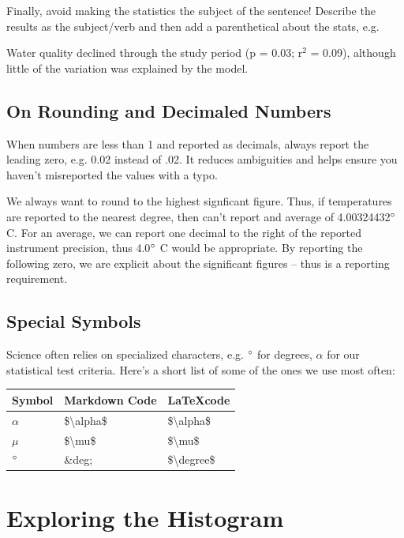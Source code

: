 \documentclass{article}\usepackage[]{graphicx}\usepackage[]{color}
\begin{document}
Finally, avoid making the statistics the subject of the sentence! Describe the results as the subject/verb and then add a parenthetical about the stats, e.g.

\noindent Water quality declined through the study period (p = 0.03; r$^2$ = 0.09), although little of the variation was explained by the model. 

\subsection{On Rounding and Decimaled Numbers}

When numbers are less than 1 and reported as decimals, always report the leading zero, e.g. 0.02 instead of .02. It reduces ambiguities and helps ensure you haven't misreported the values with a typo.

We always want to round to the highest signficant figure. Thus, if temperatures are reported to the nearest degree, then can't report and average of 4.00324432$\degree$ C. For an average, we can report one decimal to the right of the reported instrument precision, thus 4.0$\degree$ C would be appropriate. By reporting the following zero, we are explicit about the significant figures -- thus is a reporting requirement. 

\subsection{Special Symbols}

Science often relies on specialized characters, e.g. $\degree$ for degrees, $\alpha$ for our statistical test criteria. Here's a short list of some of the ones we use most often:

\begin{table}
\begin{tabular}{lll}\hline
Symbol  & Markdown Code & \LaTeX code \\ \hline\hline

$\alpha$ & \$\textbackslash alpha\$ & \$\textbackslash alpha\$ \\

$\mu$ & \$\textbackslash mu\$ & \$\textbackslash mu\$ \\

$\degree$ & \&deg; & \$\textbackslash degree\$ \\ 
\hline
\end{tabular}
\end{table}

\section{Exploring the Histogram}
\end{document}
